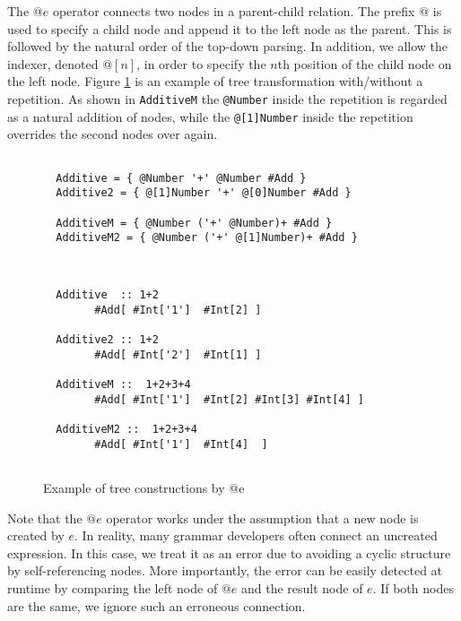 \documentclass[JIP]{ipsj}
\begin{document}
The $@e$ operator connects two nodes in a parent-child relation. The prefix $@$ is used to specify a child node and append it to the left node as the parent. This is followed by the natural order of the top-down parsing. In addition, we allow the indexer, denoted $@[n]$, in order to specify the $n$th position of the child node on the left node. Figure \ref{fig:tree} is an example of tree transformation with/without a repetition. As shown in {\tt AdditiveM} the {\tt @Number} inside the repetition is regarded as a natural addition of nodes, while the {\tt @[1]Number} inside the repetition overrides the second nodes over again.  

\begin{figure}[tb]

{\small \begin{framed} \begin{verbatim}

  Additive = { @Number '+' @Number #Add }
  Additive2 = { @[1]Number '+' @[0]Number #Add }

  AdditiveM = { @Number ('+' @Number)+ #Add }
  AdditiveM2 = { @Number ('+' @[1]Number)+ #Add }
  
\end{verbatim}\end{framed}}

{\small \begin{verbatim}

  Additive  :: 1+2
        #Add[ #Int['1']  #Int[2] ]

  Additive2 :: 1+2
        #Add[ #Int['2']  #Int[1] ]

  AdditiveM ::  1+2+3+4
        #Add[ #Int['1']  #Int[2] #Int[3] #Int[4] ]

  AdditiveM2 ::  1+2+3+4
        #Add[ #Int['1']  #Int[4]  ]
  
\end{verbatim}}

\caption{Example of tree constructions by @e}
\label{fig:tree}
\end{figure}

Note that the $@e$ operator works under the assumption that a new node is created by $e$. In reality, many grammar developers often connect an uncreated expression. In this case, we treat it as an error due to avoiding a cyclic structure by self-referencing nodes. More importantly, the error can be easily detected at runtime by comparing the left node of $@e$ and the result node of $e$. If both nodes are the same, we ignore such an erroneous connection. 
\end{document}
